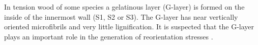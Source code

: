 In tension wood of some species a gelatinous layer (G-layer)
is formed on the inside of the innermost wall (S1, S2 or S3)\cite{gardiner2014biology}. The
G-layer has near vertically oriented microfibrils and very little lignification.
It is suspected that the G-layer plays an important role in the generation of
reorientation stresses \cite{Pilate_2004}.